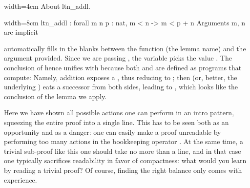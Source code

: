 \begin{coq-left}{}{width=4cm}
About ltn_addl.
$~$
$~$
\end{coq-left}
\begin{coqout-right}{}{width=8cm}
ltn_addl : forall m n p : nat,
  m < n -> m < p + n
Arguments m, n are implicit
\end{coqout-right}

 automatically fills in the blanks between the function
(the lemma name) and the argument  provided.
Since we are passing , the
variable  picks the value .  The conclusion of 
hence unifies with  because both \C{+} and \C{<} are
defined as programs that compute: Namely, addition exposes a ,
thus reducing to ; then \C{<} (or, better, the underlying
\C{<=}) eats a successor from both sides, leading to ,
which looks like the conclusion of the lemma we apply.

Here we have shown all possible actions one can perform in an intro
pattern, squeezing the entire proof into a single line.  This has
to be seen both as an opportunity and as a danger: one can easily
make a proof unreadable by performing too many actions in the bookkeeping
operator \C{=>}.  At the same time, a trivial sub-proof like this one
should take no more than a line, and in that case one typically
sacrifices readability in favor of compactness: what would you learn by
reading a trivial proof?  Of course,
finding the right balance only comes with experience.


%

